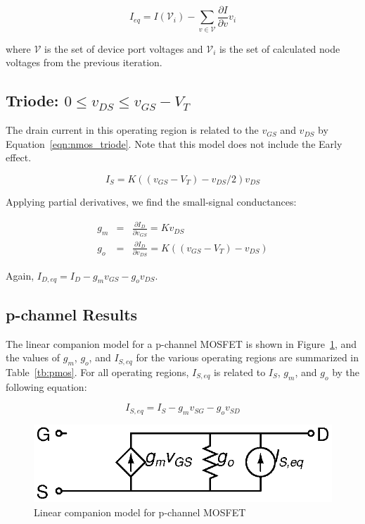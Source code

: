 \documentclass{article}
\begin{document}
\begin{equation}
\label{eqn:bias_current}
I_{eq}=I(\mathcal{V}_i)-\sum_{v \in \mathcal{V}}\frac{\partial I}{\partial v}v_i
\end{equation}

where $\mathcal{V}$ is the set of device port voltages and $\mathcal{V}_i$ is the set of calculated node voltages from the previous iteration.

\subsection{Triode: $ 0 \leq v_{DS} \leq v_{GS}-V_T $}

The drain current in this operating region is related to the $v_{GS}$ and $v_{DS}$ by Equation~\ref{eqn:nmos_triode}.  Note that this model does not include the Early effect.

\begin{equation}
\label{eqn:nmos_triode}
I_S=K((v_{GS}-V_T)-v_{DS}/2)v_{DS}
\end{equation}

Applying partial derivatives, we find the small-signal conductances:

\begin{eqnarray}
g_m&=&\frac{\partial I_D}{\partial v_{GS}}=Kv_{DS} \\
g_o&=&\frac{\partial I_D}{\partial v_{DS}}=K((v_{GS}-V_T)-v_{DS})
\end{eqnarray}

Again, $I_{D,eq}=I_D-g_mv_{GS}-g_ov_{DS}$.

\pagebreak

\subsection{p-channel Results}

The linear companion model for a p-channel MOSFET is shown in Figure~\ref{fig:pmos}, and the values of $g_m$, $g_o$, and $I_{S,eq}$ for the various operating regions are summarized in Table~\ref{tb:pmos}.  For all operating regions, $I_{S,eq}$ is related to $I_S$, $g_m$, and $g_o$ by the following equation:

\begin{equation}
I_{S,eq} =  I_S - g_m v_{SG} - g_o v_{SD}
\end{equation}

\begin{figure}[h]
\begin{center}
\includegraphics{fig/pmos.eps}
\caption{Linear companion model for p-channel MOSFET \label{fig:pmos}}
\end{center}
\end{figure}
\end{document}
